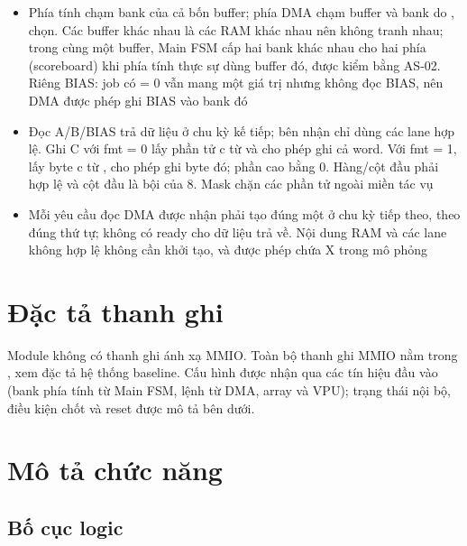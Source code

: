 \documentclass[10pt,a4paper]{article}
\begin{document}
\begin{itemize}
\item Phía tính chạm bank  của cả bốn buffer; phía DMA chạm buffer và bank do ,  chọn. Các buffer khác nhau là các RAM khác nhau nên không tranh nhau; trong cùng một buffer, Main FSM cấp hai bank khác nhau cho hai phía (scoreboard) khi phía tính thực sự dùng buffer đó, được kiểm bằng AS-02. Riêng BIAS: job có  = 0 vẫn mang một giá trị  nhưng không đọc BIAS, nên DMA được phép ghi BIAS vào bank đó
\item Đọc A/B/BIAS trả dữ liệu ở chu kỳ kế tiếp; bên nhận chỉ dùng các lane hợp lệ. Ghi C với fmt = 0 lấy phần tử c từ  và  cho phép ghi cả word. Với fmt = 1, lấy byte c từ ,  cho phép ghi byte đó; phần cao  bằng 0. Hàng/cột đầu phải hợp lệ và cột đầu là bội của 8. Mask chặn các phần tử ngoài miền tác vụ
\item Mỗi yêu cầu đọc DMA được nhận phải tạo đúng một  ở chu kỳ tiếp theo, theo đúng thứ tự; không có ready cho dữ liệu trả về. Nội dung RAM và các lane không hợp lệ không cần khởi tạo, và được phép chứa X trong mô phỏng
\end{itemize}

\section{Đặc tả thanh ghi}
Module không có thanh ghi ánh xạ MMIO. Toàn bộ thanh ghi MMIO nằm trong , xem đặc tả hệ thống baseline. Cấu hình được nhận qua các tín hiệu đầu vào (bank phía tính từ Main FSM, lệnh từ DMA, array và VPU); trạng thái nội bộ, điều kiện chốt và reset được mô tả bên dưới.

\section{Mô tả chức năng}
\subsection{Bố cục logic}\label{sec:4}
\end{document}

